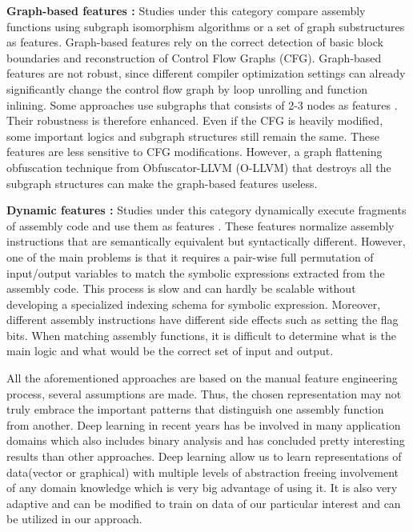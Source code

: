 \textbf{Graph-based features :} Studies under this category compare assembly functions using subgraph isomorphism algorithms \cite{Ding, Eschweiler, Pewny} or a set of graph substructures \cite{Feng, Khoo, Kruegel} as features. Graph-based features rely on the correct detection of basic block boundaries
and reconstruction of Control Flow Graphs (CFG). Graph-based features are not robust, since different compiler optimization settings can already significantly change the control flow graph by loop unrolling and function inlining. Some approaches use subgraphs that consists of 2-3 nodes as features \cite{Khoo, Kruegel}. Their robustness is therefore enhanced. Even if the CFG is heavily modified, some important logics and subgraph structures still remain the same.
These features are less sensitive to CFG modifications. However, a graph flattening obfuscation technique from Obfuscator-LLVM (O-LLVM) \cite{Junod} that destroys all the subgraph structures can make
the graph-based features useless.

\textbf{Dynamic features :} Studies under this category dynamically execute fragments of assembly code and use them as features \cite{Chandramohan, David, Pewny}. These features normalize assembly instructions that are semantically equivalent but syntactically different. However, one of the main problems is that it requires a pair-wise full permutation of  input/output variables to match the symbolic expressions extracted from the assembly code. This process is slow and can hardly be scalable without developing a specialized indexing schema for symbolic expression. Moreover, different assembly instructions have different side effects such as setting the flag bits. When matching assembly functions, it is difficult to determine what is the main logic and what would be the correct set of input and output. 


All the aforementioned approaches are based on the manual feature engineering process, several assumptions are made. Thus, the chosen representation may not truly embrace the important patterns that distinguish one assembly function from another. Deep learning \cite{LeCun} in recent years has be involved in many application domains which also includes binary analysis and has concluded pretty interesting results than other approaches. Deep learning allow us to learn representations of data(vector or graphical) with multiple levels of abstraction freeing involvement of any domain knowledge which is very big advantage of using it. It is also very adaptive and can be modified to train on data of our particular interest and can be utilized in our approach.

